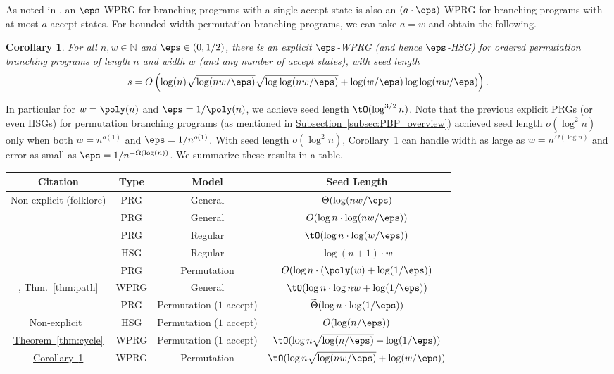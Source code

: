 \documentclass[11pt]{article}
\newcommand{\expref}[2]{\texorpdfstring{\hyperref[#2]{#1~\ref{#2}}}{#1~\ref{#2}}}
\newtheorem{corollary}[theorem]{Corollary}
\newcommand{\N}{{\mathbb N}}
\begin{document}
As noted in \cite{HozaPyVa21}, an $\eps$-WPRG for branching programs with a single accept state is also an $(a\cdot \eps)$-WPRG for branching programs with at most $a$ accept states.  For bounded-width permutation branching programs, we can take $a=w$ and obtain the following. %
\begin{corollary} \label{cor:permutation-polywidth}
For all $n,w\in \N$ and $\eps \in (0,1/2)$, there is an explicit $\eps$-WPRG (and hence $\eps$-HSG) for ordered permutation branching 
programs of length $n$ and width $w$ (and any number of accept states), with seed length
$$s=O\left(\log(n)\sqrt{\log(nw/\eps)}\sqrt{\log\log(nw/\eps)}+\log(w/\eps)\log\log(nw/\eps)\right).$$
\end{corollary}
In particular for $w=\poly(n)$ and $\eps=1/\poly(n)$, we achieve seed length $\tO(\log^{3/2} n)$.  Note that the previous explicit PRGs (or even HSGs) for permutation branching programs (as mentioned in \expref{Subsection}{subsec:PBP_overview}) achieved seed length $o(\log^2 n)$ only when both $w=n^{o(1)}$ and $\eps=1/n^{o(1)}$.  With seed length $o(\log^2 n)$, 
\expref{Corollary}{cor:permutation-polywidth} can handle width as large as $w=n^{\tilde{\Omega}(\log n)}$ and error as small as $\eps=1/n^{-\tilde{\Omega}(\log(n))}$. 
We summarize these results in a table.\\

%
%
%
\hspace{-0.6cm}
\begin{tabular}{c|c|c|c}    %
     Citation & Type & Model & Seed Length \\\hline
     Non-explicit (folklore) & PRG & General & $\Theta(\log(nw/\eps)$\\
     \cite{Nisan92,ImpagliazzoNiWi94} & PRG & General & $O(\log n \cdot \log(nw/\eps))$\\
     \cite{BravermanRaRaYe10} & PRG & Regular & $\tO(\log n \cdot \log(w/\eps))$\\
     \cite{BravermanRaRaYe10} & HSG & Regular & $\log(n+1)\cdot w$\\
     \cite{KouckyNiPu11,De11,Steinke12} & PRG & Permutation & $O(\log n\cdot (\poly(w)+\log(1/\eps))$\\
     \cite{BravermanCoGa18,ChattopadhyayLi20}, \expref{Thm.}{thm:path} & WPRG & General & $\tO(\log n\cdot \log nw+\log(1/\eps))$\\
%
     \cite{HozaPyVa21} & PRG & Permutation ($1$ accept) & $\widetilde{\Theta}(\log n\cdot \log(1/\eps))$\\
     Non-explicit~\cite{HozaPyVa21} & HSG & Permutation ($1$ accept) & $O(\log (n/\eps))$\\
     \expref{Theorem}{thm:cycle} & WPRG & Permutation ($1$ accept) & $\tO(\log n\sqrt{\log(n/\eps)}+\log(1/\eps))$\\
%
     \expref{Corollary}{cor:permutation-polywidth} & WPRG & Permutation & $\tO(\log n\sqrt{\log(nw/\eps)}+\log(w/\eps))$\\
\end{tabular}
\end{document}
